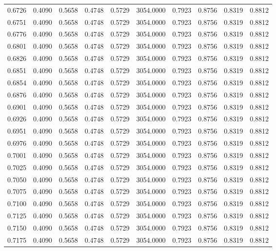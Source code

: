 \begin{tabular}{rrrrrrrrrr}
0.6726 & 0.4090 & 0.5658 & 0.4748 & 0.5729 & 3054.0000 & 0.7923 & 0.8756 & 0.8319 & 0.8812 \\
0.6751 & 0.4090 & 0.5658 & 0.4748 & 0.5729 & 3054.0000 & 0.7923 & 0.8756 & 0.8319 & 0.8812 \\
0.6776 & 0.4090 & 0.5658 & 0.4748 & 0.5729 & 3054.0000 & 0.7923 & 0.8756 & 0.8319 & 0.8812 \\
0.6801 & 0.4090 & 0.5658 & 0.4748 & 0.5729 & 3054.0000 & 0.7923 & 0.8756 & 0.8319 & 0.8812 \\
0.6826 & 0.4090 & 0.5658 & 0.4748 & 0.5729 & 3054.0000 & 0.7923 & 0.8756 & 0.8319 & 0.8812 \\
0.6851 & 0.4090 & 0.5658 & 0.4748 & 0.5729 & 3054.0000 & 0.7923 & 0.8756 & 0.8319 & 0.8812 \\
0.6854 & 0.4090 & 0.5658 & 0.4748 & 0.5729 & 3054.0000 & 0.7923 & 0.8756 & 0.8319 & 0.8812 \\
0.6876 & 0.4090 & 0.5658 & 0.4748 & 0.5729 & 3054.0000 & 0.7923 & 0.8756 & 0.8319 & 0.8812 \\
0.6901 & 0.4090 & 0.5658 & 0.4748 & 0.5729 & 3054.0000 & 0.7923 & 0.8756 & 0.8319 & 0.8812 \\
0.6926 & 0.4090 & 0.5658 & 0.4748 & 0.5729 & 3054.0000 & 0.7923 & 0.8756 & 0.8319 & 0.8812 \\
0.6951 & 0.4090 & 0.5658 & 0.4748 & 0.5729 & 3054.0000 & 0.7923 & 0.8756 & 0.8319 & 0.8812 \\
0.6976 & 0.4090 & 0.5658 & 0.4748 & 0.5729 & 3054.0000 & 0.7923 & 0.8756 & 0.8319 & 0.8812 \\
0.7001 & 0.4090 & 0.5658 & 0.4748 & 0.5729 & 3054.0000 & 0.7923 & 0.8756 & 0.8319 & 0.8812 \\
0.7025 & 0.4090 & 0.5658 & 0.4748 & 0.5729 & 3054.0000 & 0.7923 & 0.8756 & 0.8319 & 0.8812 \\
0.7050 & 0.4090 & 0.5658 & 0.4748 & 0.5729 & 3054.0000 & 0.7923 & 0.8756 & 0.8319 & 0.8812 \\
0.7075 & 0.4090 & 0.5658 & 0.4748 & 0.5729 & 3054.0000 & 0.7923 & 0.8756 & 0.8319 & 0.8812 \\
0.7100 & 0.4090 & 0.5658 & 0.4748 & 0.5729 & 3054.0000 & 0.7923 & 0.8756 & 0.8319 & 0.8812 \\
0.7125 & 0.4090 & 0.5658 & 0.4748 & 0.5729 & 3054.0000 & 0.7923 & 0.8756 & 0.8319 & 0.8812 \\
0.7150 & 0.4090 & 0.5658 & 0.4748 & 0.5729 & 3054.0000 & 0.7923 & 0.8756 & 0.8319 & 0.8812 \\
0.7175 & 0.4090 & 0.5658 & 0.4748 & 0.5729 & 3054.0000 & 0.7923 & 0.8756 & 0.8319 & 0.8812 \\

\end{tabular}
